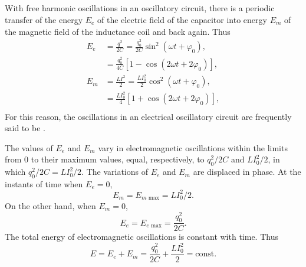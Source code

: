 \subsection{}\label{28.3.3} With free harmonic oscillations in an oscillatory circuit, there is a periodic transfer of the energy $E_{e}$ of the electric field of the capacitor into energy $E_{m}$ of the magnetic field of the inductance coil and back again. Thus
\begin{align*}%
E_{e} & = \frac{q^{2}}{2C} = \frac{q_{0}^{2}}{2C} \sin^{2} ( \omega t + \varphi_{0}),\\
& =  \frac{q_{0}^{2}}{4C} \left[ 1 - \cos( 2\omega t + 2\varphi_{0}) \right],\\
E_{m} & = \frac{LI^{2}}{2} = \frac{LI_{0}^{2}}{2} \cos^{2} ( \omega t + \varphi_{0}),\\
& =  \frac{LI_{0}^{2}}{4} \left[ 1 + \cos( 2\omega t + 2\varphi_{0}) \right],\\\end{align*}
For this reason, the oscillations in an electrical oscillatory circuit are frequently said to be .

The values of $E_{e}$ and $E_{m}$ vary in electromagnetic oscillations within the limits from 0 to their maximum values, equal, respectively, to $q_{0}^{2}/2C$ and $LI_{0}^{2}/2$, in which $q_{0}^{2}/2C = LI_{0}^{2}/2$. The variations of $E_{e}$ and $E_{m}$ are displaced in phase. At the instants of time when $E_{e} = 0$,
\begin{equation*}%
E_{m} = E_{m \,\, \textrm{max}}= LI_{0}^{2}/2.
\end{equation*}
On the other hand, when $E_{m} = 0$, 
\begin{equation*}%
E_{e} = E_{e \,\, \textrm{max}} = \frac{q_{0}^{2}}{2C}.
\end{equation*}
The total energy of electromagnetic oscillations is constant with time. Thus
\begin{equation*}%
E = E_{e} + E_{m} = \frac{q_{0}^{2}}{2C} + \frac{LI_{0}^{2}}{2} = \text{const.} 
\end{equation*}

